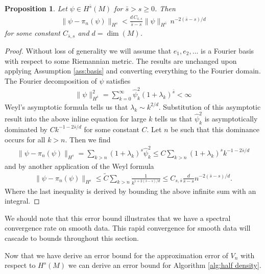 \documentclass[12pt]{amsart}
\newtheorem{prop}[thm]{Proposition}
\begin{document}
\begin{prop} \label{prop:approximation}
	Let $\psi \in H^{\bar{s}}(M)$ for $\bar{s} > s \geq 0$.
	Then
	\begin{align}
		\| \psi - \pi_{n}(\psi) \|_{H^{s}} <  \frac{d \, C_{\bar{s},s} }{ \bar{s}-s} \| \psi \|_{H^{\bar{s}}} \, n^{-2(\bar{s}-s)/d}
	\end{align}
	for some constant $C_{\bar{s},s}$ and $d = \dim(M)$.
\end{prop}
\begin{proof}
	Without loss of generality we will assume that $e_{1},e_{2},\dots$ is a Fourier basis with respect to some Riemannian metric.
	The results are unchanged upon applying Assumption \ref{ass:basis} and converting everything to the Fourier domain.
	The Fourier decomposition of $\psi$ satisfies
	\begin{align}
		\| \psi \|^{2}_{H^{\bar{s} }} = \sum_{k=0}^{\infty} \hat{\psi}_{k}^{2} (1+\lambda_{k})^{\bar{s}} < \infty
	\end{align}
	Weyl's asymptotic formula tells us that $\lambda_{k} \sim k^{2/d}$.
	Substitution of this asymptotic result into the above inline equation for large $k$ tells us that $\hat{\psi}_{k}^{2}$ is asymptotically dominated by  $C k^{-1- 2\bar{s}/d}$
	for some constant $C$.
	Let $n$ be such that this dominance occurs for all $k>n$.  Then we find
	\begin{align}
		\| \psi - \pi_{n}(\psi) \|_{H^{s}} = \sum_{k>n} (1+\lambda_{k})^{s} \hat{\psi}_{k}^{2} \leq C \sum_{k>n} (1+\lambda_{k})^{s} k^{-1- 2\bar{s}/d}
	\end{align}
	and by another application of the Weyl formula
	\begin{align}
		\| \psi - \pi_{n}(\psi) \|_{H^{s}} \leq \tilde{C} \sum_{k>n} \frac{1}{k^{1+2(\bar{s}-s)/d}} \leq C_{s,\bar{s}}  \frac{d }{ \bar{s}-s} n^{-2(\bar{s}-s)/d}.
	\end{align}
	Where the last inequality is derived by bounding the above infinite sum with an integral.
\end{proof}

We should note that this error bound illustrates that we have a spectral convergence rate on smooth data.
This rapid convergence for smooth data will cascade to bounds throughout this section.

Now that we have derive an error bound for the approximation error of $V_{n}$ with respect to $H^{s}(M)$ we can 
derive an error bound for Algorithm \ref{alg:half density}.
\end{document}
